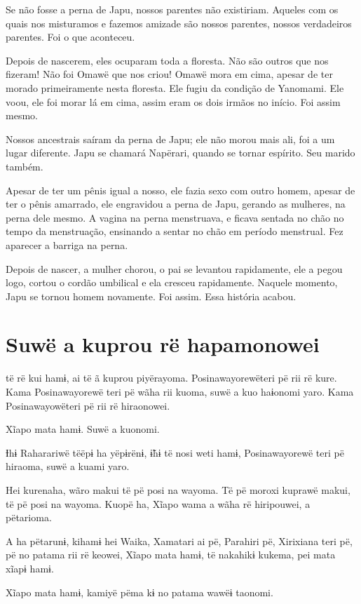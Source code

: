 Se não fosse a perna de Japu, nossos parentes não existiriam. Aqueles
com os quais nos misturamos e fazemos amizade são nossos parentes,
nossos verdadeiros parentes. Foi o que aconteceu.

Depois de nascerem, eles ocuparam toda a floresta. Não são outros que
nos fizeram! Não foi Omawë que nos criou! Omawë mora em cima, apesar de
ter morado primeiramente nesta floresta. Ele fugiu da condição de
Yanomami. Ele voou, ele foi morar lá em cima, assim eram os dois irmãos
no início. Foi assim mesmo. 

Nossos ancestrais saíram da perna de Japu; ele não morou mais ali, foi a
um lugar diferente. Japu se chamará Napërari, quando se tornar
espírito. Seu marido também.

Apesar de ter um pênis igual a nosso, ele fazia sexo com outro homem,
apesar de ter o pênis amarrado, ele engravidou a perna de Japu, gerando
as mulheres, na perna dele mesmo. A vagina na perna menstruava, e ficava
sentada no chão no tempo da menstruação, ensinando a sentar no chão em
período menstrual. Fez aparecer a barriga na perna. 

Depois de nascer, a mulher chorou, o pai se levantou rapidamente, ele a
pegou logo, cortou o cordão umbilical e ela cresceu rapidamente. Naquele
momento, Japu se tornou homem novamente. Foi assim. Essa história
acabou.

\chapter{Suwë a kuprou rë hapamonowei}

 të rë kui hamɨ, ai të ã kuprou piyërayoma. Posinawayorewëteri pë rii
rë kure. Kama Posinawayorewë teri pë wãha rii kuoma, suwë a kuo haɨonomi
yaro. Kama Posinawayowëteri pë rii rë hiraonowei. 

Xĩapo mata hamɨ. Suwë a kuonomi. 

Ɨhɨ Raharariwë tëëpɨ ha yëpɨrënɨ, ɨ̃hɨ të nosi weti hamɨ, Posinawayorewë
teri pë hiraoma, suwë a kuami yaro. 

Hei kurenaha, wãro makui të pë posi na wayoma. Të pë moroxi kuprawë
makui, të pë posi na wayoma. Kuopë ha, Xĩapo wama a wãha rë hiripouwei,
a pëtarioma. 

A ha pëtarunɨ, kihamɨ hei Waika, Xamatari ai pë, Parahiri pë, Xirixiana
teri pë, pë no patama rii rë keowei, Xĩapo mata hamɨ, të nakahikɨ
kukema, pei mata xĩapɨ hamɨ. 

Xĩapo mata hamɨ, kamiyë pëma kɨ no patama wawëɨ taonomi. 

